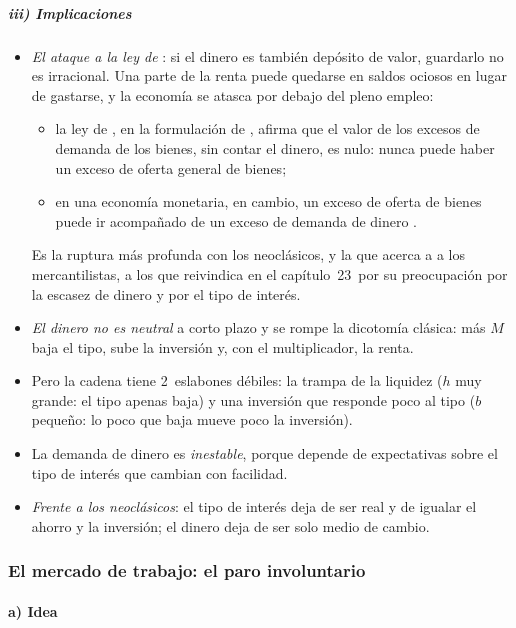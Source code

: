 \documentclass[11pt]{article}
\begin{document}
\subparagraph{iii) Implicaciones}

\begin{itemize}
\item \emph{El ataque a la ley de }: si el dinero es también depósito de valor, guardarlo no es irracional. Una parte de la renta puede quedarse en saldos ociosos en lugar de gastarse, y la economía se atasca por debajo del pleno empleo:
  \begin{itemize}
  \item la ley de , en la formulación de \textcite{Lange1942Say}, afirma que el valor de los excesos de demanda de los bienes, sin contar el dinero, es nulo: nunca puede haber un exceso de oferta general de bienes;
  \item en una economía monetaria, en cambio, un exceso de oferta de bienes puede ir acompañado de un exceso de demanda de dinero\nocite{BeckerBaumol1952Classical} .
  \end{itemize}
  Es la ruptura más profunda con los neoclásicos, y la que acerca a  a los mercantilistas, a los que reivindica en el capítulo~23~por su preocupación por la escasez de dinero y por el tipo de interés\nocite{Barber1967History}.
\item \emph{El dinero no es neutral} a corto plazo y se rompe la dicotomía clásica: más $M$ baja el tipo, sube la inversión y, con el multiplicador, la renta.
\item Pero la cadena tiene 2~eslabones débiles: la trampa de la liquidez ($h$ muy grande: el tipo apenas baja) y una inversión que responde poco al tipo ($b$ pequeño: lo poco que baja mueve poco la inversión).
\item La demanda de dinero es \emph{inestable}, porque depende de expectativas sobre el tipo de interés que cambian con facilidad.
\item \emph{Frente a los neoclásicos}: el tipo de interés deja de ser real y de igualar el ahorro y la inversión; el dinero deja de ser solo medio de cambio.
\end{itemize}

\subsubsection{El mercado de trabajo: el paro involuntario}\label{sec:trabajo}

\paragraph{a) Idea}
\end{document}

